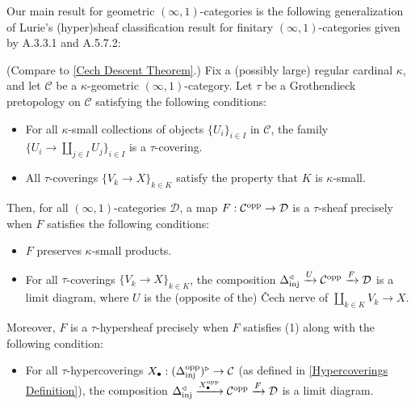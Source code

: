 \documentclass[10pt]{article}
\newcommand{\C}{\mathcal C}
\newcommand{\cD}{\mathcal{D}}
\theoremstyle{witharg}
\theoremstyle{witharg}
\theoremstyle{witharg2}
\begin{document}
\noindent Our main result for geometric $(\infty,1)$-categories is the following generalization of Lurie's (hyper)sheaf classification result for finitary $(\infty,1)$-categories given by  A.3.3.1 and  A.5.7.2: 


\begin{theorem}{}\label{Cech Descent Intro}

  (Compare to \ref{Cech Descent Theorem}.) Fix a (possibly large) regular cardinal $\kappa$, and let $\C$ be a $\kappa$-geometric $(\infty,1)$-category. Let $\tau$ be a Grothendieck pretopology on $\C$ satisfying the following conditions: 

    \begin{itemize}
    
        \item [\textnormal{(i)}] For all $\kappa$-small collections of objects $\{U_i\}_{i\in I}$ in $\C$, the family $\{U_i\rightarrow \coprod_{j\in I}U_j\}_{i\in I}$ is a $\tau$-covering. 

        \item [\textnormal{(ii)}] All $\tau$-coverings $\{V_k\rightarrow X\}_{k\in K}$ satisfy the property that $K$ is $\kappa$-small.

    \end{itemize}

    \noindent Then, for all $(\infty,1)$-categories $\cD$, a map $F:\C^{\textnormal{opp}}\rightarrow \cD$ is a $\tau$-sheaf precisely when $F$ satisfies the following conditions: 

    \begin{itemize}

        \item [$(1)$] $F$ preserves $\kappa$-small products. 


        \item [$(2)$] For all $\tau$-coverings $\{V_k\rightarrow X\}_{k\in K}$, the composition $\Delta_{\textnormal{inj}}^\triangleleft\xrightarrow{U}\C^{\textnormal{opp}}\xrightarrow{F}\cD$ is a limit diagram, where $U$ is the (opposite of the) \v{C}ech nerve of $\coprod_{k\in K}V_k\rightarrow X$. 

    \end{itemize}

    \noindent Moreover, $F$ is a $\tau$-hypersheaf precisely when $F$ satisfies (1) along with the following condition:

    \begin{itemize}
    
        \item [$(2^\prime)$] For all $\tau$-hypercoverings $X_\bullet:(\Delta^{\textnormal{opp}}_{\textnormal{inj}})^\triangleright\rightarrow \C$ (as defined in \ref{Hypercoverings Definition}), the composition $\Delta_{\textnormal{inj}}^\triangleleft\xrightarrow{X_\bullet^{\textnormal{opp}}}\C^{\textnormal{opp}}\xrightarrow{F}\cD$ is a limit diagram.

    \end{itemize}
    
\end{theorem}
\end{document}

